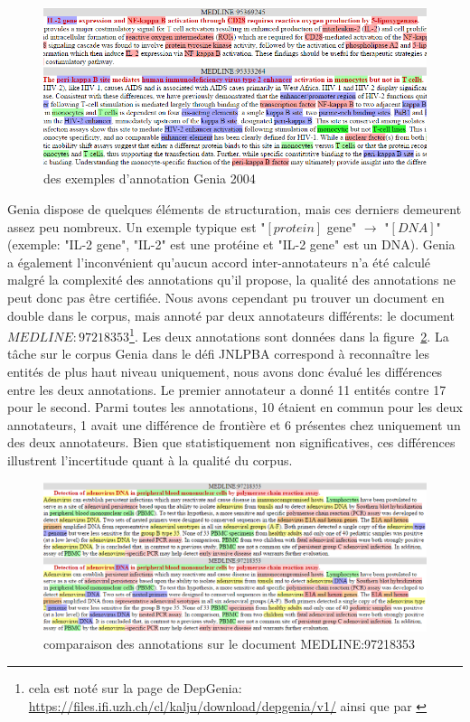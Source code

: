 \documentclass[12pt,a4paper,times,twoside,openright]{report}
\begin{document}
\begin{figure}[ht!]
\centering
\includegraphics[scale=0.6]{images/genia/examples}
\caption{des exemples d'annotation Genia 2004}
\label{fig:genia-examples}
\end{figure}

Genia dispose de quelques éléments de structuration, mais ces derniers demeurent assez peu nombreux. Un exemple typique est "$[protein]$ gene" $\rightarrow$ "$[DNA]$" (exemple: "IL-2 gene", "IL-2" est une protéine et "IL-2 gene" est un DNA). Genia a également l'inconvénient qu'aucun accord inter-annotateurs n'a été calculé malgré la complexité des annotations qu'il propose, la qualité des annotations ne peut donc pas être certifiée. Nous avons cependant pu trouver un document en double dans le corpus, mais annoté par deux annotateurs différents: le document $MEDLINE:97218353$\footnote{cela est noté sur la page de DepGenia: \url{https://files.ifi.uzh.ch/cl/kalju/download/depgenia/v1/} ainsi que par \citet{lease2005parsing}}. Les deux annotations sont données dans la figure\ \ref{fig:genia-medline-97218353}. La tâche sur le corpus Genia dans le défi JNLPBA correspond à reconnaître les entités de plus haut niveau uniquement, nous avons donc évalué les différences entre les deux annotations. Le premier annotateur a donné 11 entités contre 17 pour le second. Parmi toutes les annotations, 10 étaient en commun pour les deux annotateurs, 1 avait une différence de frontière et 6 présentes chez uniquement un des deux annotateurs. Bien que statistiquement non significatives, ces différences illustrent l'incertitude quant à la qualité du corpus.

\begin{figure}[ht!]
\centering
\includegraphics[scale=0.5]{images/genia/MEDLINE-97218353}
\caption{comparaison des annotations sur le document MEDLINE:97218353}
\label{fig:genia-medline-97218353}
\end{figure}
\end{document}
